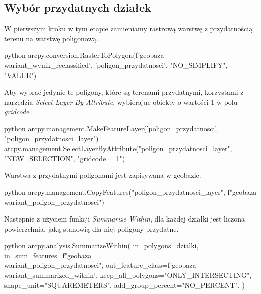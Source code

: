 \documentclass{article}
\begin{document}
\newpage

\subsection{Wybór przydatnych działek}
W pierwszym kroku w tym etapie zamieniamy rastrową warstwę z przydatnością terenu na warstwę poligonową.
\vspace{5pt}

\begin{mintedbox}{python}
arcpy.conversion.RasterToPolygon(f'{geobaza}\\{wariant}_wynik_reclassified', 'poligon_przydatnosci', "NO_SIMPLIFY", "VALUE")
\end{mintedbox}
\vspace{10pt}

Aby wybrać jedynie te poligony, które są terenami przydatnymi, korzystami z narzędzia \textit{Select Layer By Attribute}, wybierając obiekty o wartości 1 w polu \textit{gridcode}.
\vspace{5pt}

\begin{mintedbox}{python}
arcpy.management.MakeFeatureLayer('poligon_przydatnosci', "poligon_przydatnosci_layer")
arcpy.management.SelectLayerByAttribute("poligon_przydatnosci_layer", "NEW_SELECTION", "gridcode = 1")
\end{mintedbox}
\vspace{10pt}

Warstwa z przydatnymi poligonami jest zapisywana w geobazie.
\vspace{5pt}

\begin{mintedbox}{python}
arcpy.management.CopyFeatures("poligon_przydatnosci_layer", f"{geobaza}\\{wariant}_poligon_przydatnosci")
\end{mintedbox}
\vspace{10pt}

Następnie z użyciem funkcji \textit{Summarize Within}, dla każdej działki jest liczona powierzchnia, jaką stanowią dla niej poligony przydatne.
\vspace{5pt}

\begin{mintedbox}{python}
arcpy.analysis.SummarizeWithin(
    in_polygons=dzialki,
    in_sum_features=f"{geobaza}\\{wariant}_poligon_przydatnosci",
    out_feature_class=f'{geobaza}\\{wariant}_summarized_within',
    keep_all_polygons="ONLY_INTERSECTING",
    shape_unit="SQUAREMETERS",
    add_group_percent="NO_PERCENT",
)    
\end{mintedbox}
\vspace{10pt}
\end{document}
